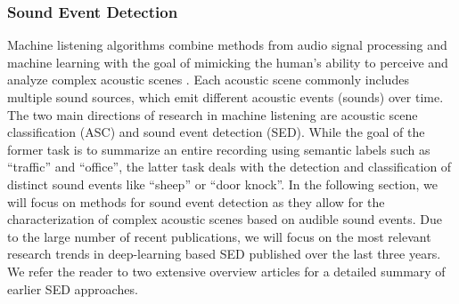 \documentclass[11pt]{article}
\begin{document}

\subsubsection{Sound Event Detection}

Machine listening algorithms combine methods from audio signal processing and machine learning with the goal of mimicking the human's ability to perceive and analyze complex acoustic scenes \cite{Virtanen:2018:SoundSceneBook:BOOK }.
Each acoustic scene commonly includes multiple sound sources, which emit different acoustic events (sounds) over time.
The two main directions of research in machine listening are acoustic scene classification (ASC) \cite{Barchiesi:2015:ASC:SPM} and sound event detection (SED).
While the goal of the former task is to summarize an entire recording using semantic labels such as ``traffic'' and ``office'', the latter task deals with the detection and classification of distinct sound events like ``sheep'' or ``door knock''. In the following section, we will focus on methods for sound event detection as they allow for the characterization of complex acoustic scenes based on audible sound events. 
Due to the large number of recent publications, we will focus on the most relevant research trends in deep-learning based SED published over the last three years.
We refer the reader to two extensive overview articles \cite{Xia:2019:EventDetection:CSSR, Dang:2017:SurveyAED:ICOT} for a detailed summary of earlier SED approaches.
\end{document}
